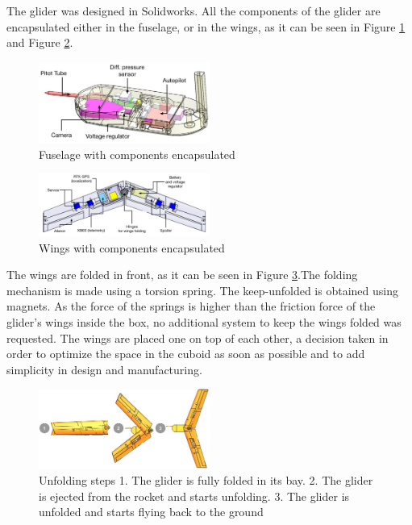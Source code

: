 The glider was designed in Solidworks. All the components of the glider are encapsulated either in the fuselage, or in the wings, as it can be seen in Figure \ref{f:fuseg} and Figure  \ref{f:wings}.

\begin{figure}[h!]
    \centering
        \includegraphics[width=0.5\textwidth]{img/fuselage.jpg}
        \caption{Fuselage with components encapsulated}
        \label{f:fuseg}
 \end{figure}

\begin{figure}[h!]
    \centering
        \includegraphics[width=0.5\textwidth]{img/wings.jpg}
        \caption{Wings with components encapsulated}
        \label{f:wings}
 \end{figure}



The wings are folded in front, as it can be seen in Figure \ref{f:folding}.The folding mechanism is made using a torsion spring. The keep-unfolded is obtained using magnets. As the force of the springs is higher than the friction force of the glider's wings inside the box, no additional system to keep the wings folded was requested. The wings are placed one on top of each other, a decision taken in order to optimize the space in the cuboid as soon as possible and to add simplicity in design and manufacturing.

\begin{figure}[h!]
    \centering
        \includegraphics[width=0.5\textwidth]{img/folding.jpg}
        \caption{Unfolding steps 1. The glider is fully folded in its bay. 2. The glider is ejected from the rocket and starts unfolding. 3. The glider is unfolded and starts flying back to the ground}
        \label{f:folding}
 \end{figure}

